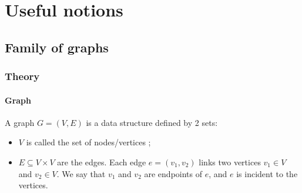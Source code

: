 \documentclass[table]{report}
\begin{document}

%
%
%
%


\chapter{Useful notions}
\minitoc
\section{Family of graphs}

\subsection{Theory}
\subsubsection{Graph}
\noindent
A graph $G = (V,E)$ is a data structure defined by 2 sets:
\begin{itemize}[noitemsep]
    \item $V$ is called the set of nodes/vertices ;
    \item $E \subseteq V \times V$ are the edges. Each edge $e = (v_1, v_2)$ links two vertices $v_1 \in V$ and $v_2 \in V$.  We say that $v_1$ and $v_2$ are endpoints of $e$, and $e$ is incident to the vertices. 
    
\end{itemize}    
\end{document}
